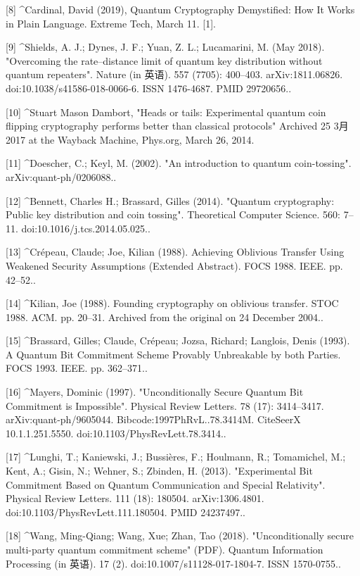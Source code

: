 [8]
^Cardinal, David (2019), Quantum Cryptography Demystified: How It Works in Plain Language. Extreme Tech, March 11. [1].

[9]
^Shields, A. J.; Dynes, J. F.; Yuan, Z. L.; Lucamarini, M. (May 2018). "Overcoming the rate–distance limit of quantum key distribution without quantum repeaters". Nature (in 英语). 557 (7705): 400–403. arXiv:1811.06826. doi:10.1038/s41586-018-0066-6. ISSN 1476-4687. PMID 29720656..

[10]
^Stuart Mason Dambort, "Heads or tails: Experimental quantum coin flipping cryptography performs better than classical protocols" Archived 25 3月 2017 at the Wayback Machine, Phys.org, March 26, 2014.

[11]
^Doescher, C.; Keyl, M. (2002). "An introduction to quantum coin-tossing". arXiv:quant-ph/0206088..

[12]
^Bennett, Charles H.; Brassard, Gilles (2014). "Quantum cryptography: Public key distribution and coin tossing". Theoretical Computer Science. 560: 7–11. doi:10.1016/j.tcs.2014.05.025..

[13]
^Crépeau, Claude; Joe, Kilian (1988). Achieving Oblivious Transfer Using Weakened Security Assumptions (Extended Abstract). FOCS 1988. IEEE. pp. 42–52..

[14]
^Kilian, Joe (1988). Founding cryptography on oblivious transfer. STOC 1988. ACM. pp. 20–31. Archived from the original on 24 December 2004..

[15]
^Brassard, Gilles; Claude, Crépeau; Jozsa, Richard; Langlois, Denis (1993). A Quantum Bit Commitment Scheme Provably Unbreakable by both Parties. FOCS 1993. IEEE. pp. 362–371..

[16]
^Mayers, Dominic (1997). "Unconditionally Secure Quantum Bit Commitment is Impossible". Physical Review Letters. 78 (17): 3414–3417. arXiv:quant-ph/9605044. Bibcode:1997PhRvL..78.3414M. CiteSeerX 10.1.1.251.5550. doi:10.1103/PhysRevLett.78.3414..

[17]
^Lunghi, T.; Kaniewski, J.; Bussières, F.; Houlmann, R.; Tomamichel, M.; Kent, A.; Gisin, N.; Wehner, S.; Zbinden, H. (2013). "Experimental Bit Commitment Based on Quantum Communication and Special Relativity". Physical Review Letters. 111 (18): 180504. arXiv:1306.4801. doi:10.1103/PhysRevLett.111.180504. PMID 24237497..

[18]
^Wang, Ming-Qiang; Wang, Xue; Zhan, Tao (2018). "Unconditionally secure multi-party quantum commitment scheme" (PDF). Quantum Information Processing (in 英语). 17 (2). doi:10.1007/s11128-017-1804-7. ISSN 1570-0755..

